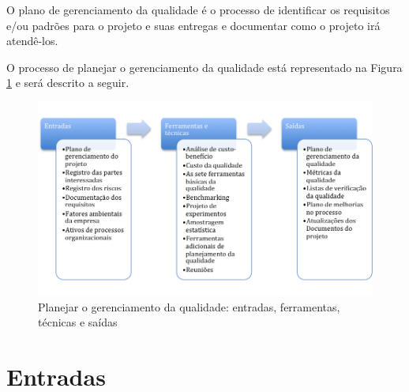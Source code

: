 
O plano de gerenciamento da qualidade é o processo de identificar os requisitos e/ou padrões para o projeto e suas entregas e documentar como o projeto irá atendê-los.

O processo de planejar o gerenciamento da qualidade está representado na Figura \ref{fig:qualidade:plan:efts} e será descrito a seguir.

\begin{figure}[!h]
	\centering
	\includegraphics[scale=0.5]{Figuras/qualidade_efts_planejar.png}
	\caption{Planejar o gerenciamento da qualidade: entradas, ferramentas, técnicas e saídas}
	\label{fig:qualidade:plan:efts}
\end{figure}

\section{Entradas}


